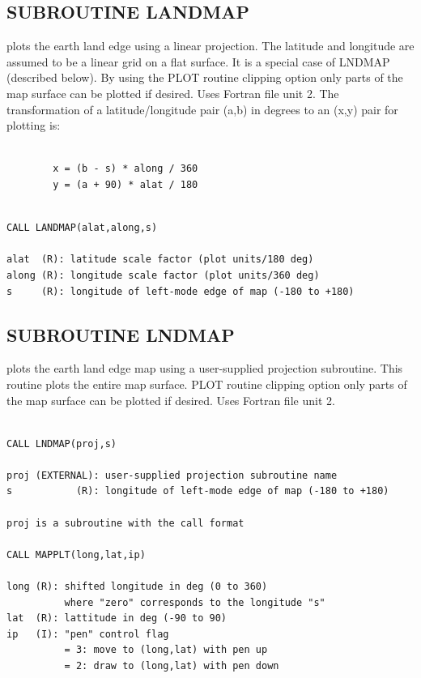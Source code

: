 \documentclass[11pt]{report}
\begin{document}
\subsection{SUBROUTINE LANDMAP}

 plots the earth land edge  using a linear projection.  The latitude and longitude are assumed to be a linear grid on a flat surface.  It
is a special case of LNDMAP (described below).  By using the PLOT
routine clipping option only parts of the map surface can be plotted
if desired.  Uses Fortran file unit 2.  The transformation of a
latitude/longitude pair (a,b) in degrees to an (x,y) pair for plotting
is:
\begin{verbatim}

        x = (b - s) * along / 360
        y = (a + 90) * alat / 180
\end{verbatim}
\begin{verbatim}

CALL LANDMAP(alat,along,s)

alat  (R): latitude scale factor (plot units/180 deg)
along (R): longitude scale factor (plot units/360 deg)
s     (R): longitude of left-mode edge of map (-180 to +180)
\end{verbatim}

\subsection{SUBROUTINE LNDMAP}

 plots the earth land edge map using a user-supplied projection
subroutine.  This routine plots the entire map surface.  PLOT
routine clipping option only parts of the map surface can be plotted
if desired.  Uses Fortran file unit 2.

\begin{verbatim}

CALL LNDMAP(proj,s)

proj (EXTERNAL): user-supplied projection subroutine name
s           (R): longitude of left-mode edge of map (-180 to +180)

proj is a subroutine with the call format

CALL MAPPLT(long,lat,ip)

long (R): shifted longitude in deg (0 to 360)
          where "zero" corresponds to the longitude "s"
lat  (R): lattitude in deg (-90 to 90)
ip   (I): "pen" control flag
          = 3: move to (long,lat) with pen up
          = 2: draw to (long,lat) with pen down
\end{verbatim}
\end{document}
